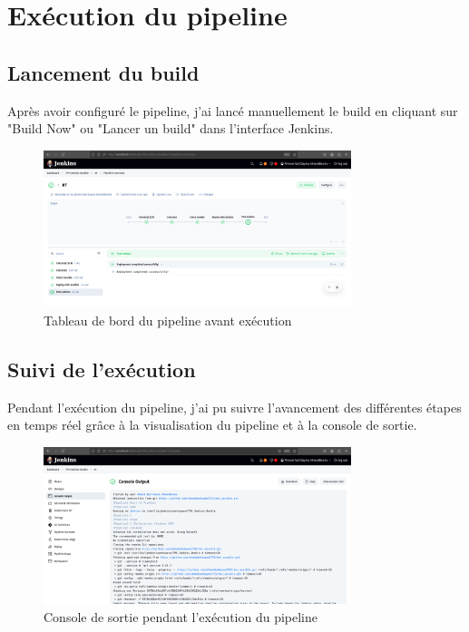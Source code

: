 \documentclass{article}
\begin{document}
\section{Exécution du pipeline}
\subsection{Lancement du build}

Après avoir configuré le pipeline, j'ai lancé manuellement le build en cliquant sur "Build Now" ou "Lancer un build" dans l'interface Jenkins.

\begin{figure}[h]
    \centering
    \includegraphics[width=0.8\textwidth]{images/jenkins_pipeline_dashboard.png}
    \caption{Tableau de bord du pipeline avant exécution}
    \label{fig:jenkins_pipeline_dashboard}
\end{figure}

\subsection{Suivi de l'exécution}

Pendant l'exécution du pipeline, j'ai pu suivre l'avancement des différentes étapes en temps réel grâce à la visualisation du pipeline et à la console de sortie.

\begin{figure}[h]
    \centering
    \includegraphics[width=0.8\textwidth]{images/jenkins_console_output.png}
    \caption{Console de sortie pendant l'exécution du pipeline}
    \label{fig:jenkins_console_output}
\end{figure}
\end{document}
